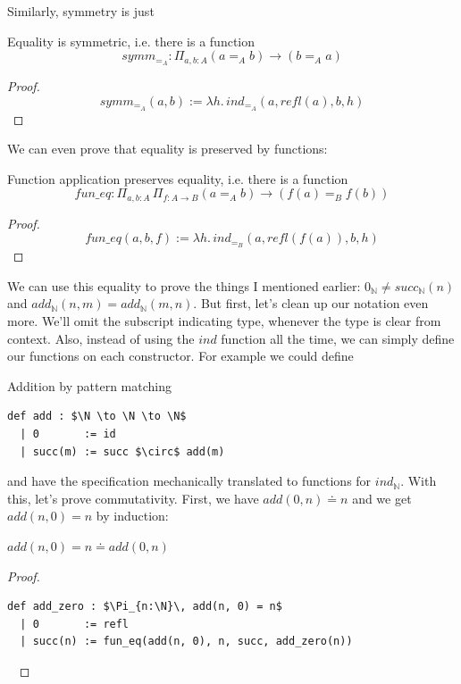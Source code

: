\documentclass[a4paper, 12pt]{article}
\newcommand{\N}{\mathbb{N}}
\newcommand{\la}[1]{\lambda{#1}.\,}
\theoremstyle{changedot}
\theoremstyle{changedotbreak}
\theoremstyle{nonumberplain}
\newtheorem{proof}{Proof}
\begin{document}
Similarly, symmetry is just
\begin{theorem}
  Equality is symmetric, i.e. there is a function
  \[symm_{=_{A}} : \Pi_{a, b : A} (a =_{A} b) \to (b =_{A} a) \]
\end{theorem}
\begin{proof}
  \[symm_{=_{A}}(a, b) := \la h ind_{=_{A}}(a, refl(a), b, h)\]
\end{proof}

We can even prove that equality is preserved by functions:
\begin{theorem}
  Function application preserves equality, i.e. there is a function
  \[\mathit{fun\_eq} : \Pi_{a, b: A}\, \Pi_{f : A \to B} (a =_{A} b) \to (f(a) =_{B} f(b))\]
\end{theorem}
\begin{proof}
  \[\mathit{fun\_eq}(a, b, f) := \la h ind_{=_{B}}(a, refl(f(a)), b, h)\]
\end{proof}

We can use this equality to prove the things I mentioned earlier: $0_{\N} \neq succ_{\N}(n)$ and $add_{\N}(n, m) = add_{\N}(m, n)$. But first, let's clean up our notation even more. We'll omit the subscript indicating type, whenever the type is clear from context. Also, instead of using the $ind$ function all the time, we can simply define our functions on each constructor. For example we could define
\begin{definition} Addition by pattern matching
\begin{lstlisting}[mathescape=true]
  def add : $\N \to \N \to \N$
  | 0       := id
  | succ(m) := succ $\circ$ add(m)
\end{lstlisting}
\end{definition}

and have the specification mechanically translated to functions for $ind_{\N}$. With this, let's prove commutativity. First, we have $add(0, n) \doteq n$ and we get $add(n, 0) = n$ by induction:

\begin{lemma}
  $add(n, 0) = n \doteq add(0, n)$
\end{lemma}
\begin{proof} ~
\begin{lstlisting}[mathescape=true]
  def add_zero : $\Pi_{n:\N}\, add(n, 0) = n$
  | 0       := refl
  | succ(n) := fun_eq(add(n, 0), n, succ, add_zero(n))
\end{lstlisting}~
\end{proof}
\end{document}
